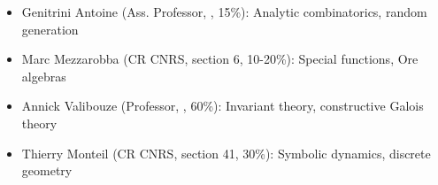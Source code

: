 \begin{itemize}

\item Genitrini Antoine (Ass. Professor, \CS, 15\%): %
  Analytic combinatorics, random generation
\item Marc Mezzarobba (CR CNRS, section 6, 10-20\%): %
  Special functions, Ore algebras
\item Annick Valibouze (Professor, \CS, 60\%): %
  Invariant theory, %
  constructive Galois theory




\item Thierry Monteil (CR CNRS, section 41, 30\%): %
  Symbolic dynamics, discrete
  geometry%


\end{itemize}
